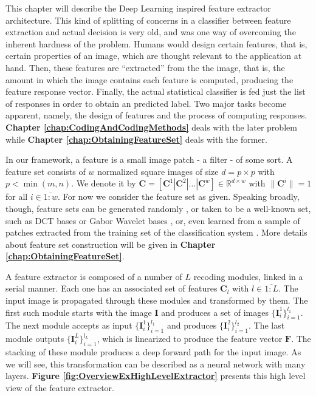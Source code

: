 \documentclass[12pt,a4paper,oneside,english]{UPBThesis}
\newcommand{\hctimes}[2]{{#1}\!\times\!{#2}}
\newcommand{\hcrange}[2]{\overline{{#1}\colon\!\!{#2}}}
\begin{document}
This chapter will describe the Deep Learning inspired feature extractor architecture. This kind of splitting of concerns in a classifier between feature extraction and actual decision is very old, and was one way of overcoming the inherent hardness of the problem. Humans would design certain features, that is, certain properties of an image, which are thought relevant to the application at hand. Then, these features are ``extracted'' from the the image, that is, the amount in which the image contains each feature is computed, producing the feature response vector. Finally, the actual statistical classifier is fed just the list of responses in order to obtain an predicted label. Two major tasks become apparent, namely, the design of features and the process of computing responses. \textbf{Chapter \ref{chap:CodingAndCodingMethods}} deals with the later problem while \textbf{Chapter \ref{chap:ObtainingFeatureSet}} deals with the former.

In our framework, a feature is a small image patch - a filter - of some sort. A feature set consists of $w$ normalized square images of size $d = \hctimes{p}{p}$ with $p < \min(m,n)$. We denote it by $\textbf{C} = \left[ \textbf{C}^1 \left|\right. \textbf{C}^2 \left|\right. \dots \left|\right. \textbf{C}^w \right] \in \mathbb{R}^{\hctimes{d}{w}}$ with $\|\mathbf{C}^i\| = 1$ for all $i \in \hcrange{1}{w}$. For now we consider the feature set as given. Speaking broadly, though, feature sets can be generated randomly \cite{random-weights-feature-learning,beyond-simple-features}, or taken to be a well-known set, such as DCT bases or Gabor Wavelet bases \cite{simple-method-sparse-coding}, or, even learned from a sample of patches extracted from the training set of the classification system \cite{emergence-sparse-coding,sparse-coding-strategy-V1,tiny-images}. More details about feature set construction will be given in \textbf{Chapter \ref{chap:ObtainingFeatureSet}}.

A feature extractor is composed of a number of $L$ recoding modules, linked in a serial manner. Each one has an associated set of features $\textbf{C}_l$ with $l \in \hcrange{1}{L}$. The input image is propagated through these modules and transformed by them. The first such module starts with the image $\textbf{I}$ and produces a set of images $\{\textbf{I}_i^1\}_{i=1}^{l_1}$. The next module accepts as input $\{\textbf{I}_i^1\}_{i=1}^{l_1}$ and produces $\{\textbf{I}_i^2\}_{i=1}^{l_2}$. The last module outputs $\{\textbf{I}_i^L\}_{i=1}^{l_L}$, which is linearized to produce the feature vector $\mathbf{F}$. The stacking of these module produces a deep forward path for the input image. As we will see, this transformation can be described as a neural network with many layers. \textbf{Figure \ref{fig:OverviewExHighLevelExtractor}} presents this high level view of the feature extractor.
\end{document}
